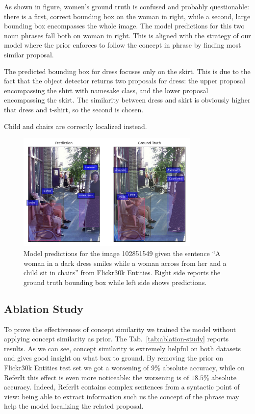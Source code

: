 As shown in figure, women's ground truth is confused and probably
questionable: there is a first, correct bounding box on the woman in
right, while a second, large bounding box encompasses the whole image.
The model predictions for this two noun phrases fall both on woman in
right. This is aligned with the strategy of our model where the prior
enforces to follow the concept in phrase by finding most similar
proposal.

The predicted bounding box for dress focuses only on the skirt. This
is due to the fact that the object detector returns two proposals for
dress: the upper proposal encompassing the shirt with namesake class,
and the lower proposal encompassing the skirt. The similarity between
dress and skirt is obviously higher that dress and t-shirt, so the
second is chosen. 

Child and chairs are correctly localized instead.

\begin{figure}
  \centering
  \includegraphics[width=0.8\textwidth]{figures/similing-woman.png}
  \caption[Model predictions for the image 102851549 from Flickr30k
    Entities]{ Model predictions for the image 102851549 given the
    sentence ``A woman in a dark dress smiles while a woman across
    from her and a child sit in chairs'' from Flickr30k Entities.
    Right side reports the ground truth bounding box while left side
    shows predictions.}
  \label{fig:qualitative-results}
\end{figure}

\subsection{Ablation Study}

To prove the effectiveness of concept similarity we trained the model
without applying concept similarity as prior. The
Tab.~\ref{tab:ablation-study} reports results. As we can see, concept
similarity is extremely helpful on both datasets and gives good
insight on what box to ground. By removing the prior on Flickr30k
Entities test set we got a worsening of $9\%$ absolute accuracy, while
on ReferIt this effect is even more noticeable: the worsening is of
$18.5\%$ absolute accuracy. Indeed, ReferIt contains complex sentences
from a syntactic point of view: being able to extract information such
us the concept of the phrase may help the model localizing the related
proposal.


